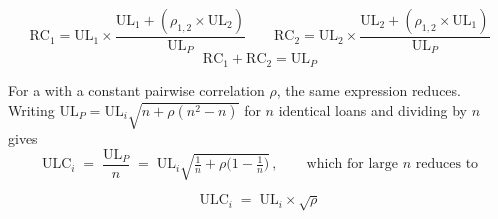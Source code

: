 \begin{crfmlbox}
\[ \mathrm{RC}_1 = \mathrm{UL}_1 \times
   \frac{\mathrm{UL}_1 + (\rho_{1,2}\times\mathrm{UL}_2)}{\mathrm{UL}_P}
   \qquad
   \mathrm{RC}_2 = \mathrm{UL}_2 \times
   \frac{\mathrm{UL}_2 + (\rho_{1,2}\times\mathrm{UL}_1)}{\mathrm{UL}_P} \]
\[ \mathrm{RC}_1 + \mathrm{RC}_2 = \mathrm{UL}_P \]
\end{crfmlbox}

For a  with a constant pairwise
correlation $\rho$, the same expression reduces. Writing $\mathrm{UL}_P =
\mathrm{UL}_i\sqrt{n + \rho(n^{2}-n)}$ for $n$ identical loans and dividing by
$n$ gives
\[ \mathrm{ULC}_i \;=\; \frac{\mathrm{UL}_P}{n}
   \;=\; \mathrm{UL}_i\sqrt{\tfrac{1}{n} + \rho\bigl(1-\tfrac{1}{n}\bigr)}\,,
   \qquad\text{which for large } n \text{ reduces to} \]

\begin{crfmlbox}
\[ \mathrm{ULC}_i \;=\; \mathrm{UL}_i \times \sqrt{\rho} \]
\end{crfmlbox}

